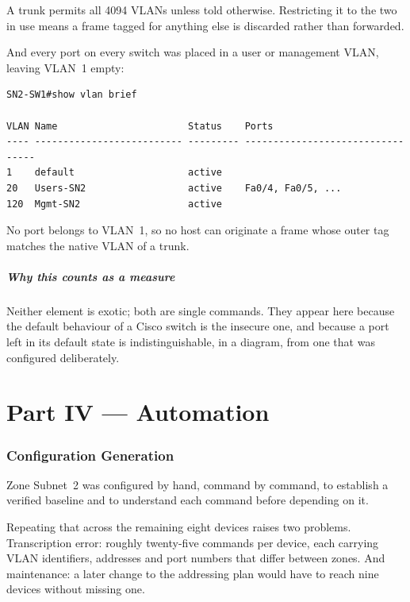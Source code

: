 \documentclass[12pt,a4paper]{article}
\begin{document}
A trunk permits all 4094 VLANs unless told otherwise. Restricting it to the two
in use means a frame tagged for anything else is discarded rather than
forwarded.

And every port on every switch was placed in a user or management VLAN, leaving
VLAN~1 empty:

\begin{lstlisting}
SN2-SW1#show vlan brief

VLAN Name                       Status    Ports
---- -------------------------- --------- ---------------------------------
1    default                    active
20   Users-SN2                  active    Fa0/4, Fa0/5, ...
120  Mgmt-SN2                   active
\end{lstlisting}

No port belongs to VLAN~1, so no host can originate a frame whose outer tag
matches the native VLAN of a trunk.

\subsubsection*{Why this counts as a measure}

Neither element is exotic; both are single commands. They appear here because
the default behaviour of a Cisco switch is the insecure one, and because a port
left in its default state is indistinguishable, in a diagram, from one that was
configured deliberately.

\part*{Part IV --- Automation}

\section{Configuration Generation}

Zone Subnet~2 was configured by hand, command by command, to establish a verified
baseline and to understand each command before depending on it.

Repeating that across the remaining eight devices raises two problems.
Transcription error: roughly twenty-five commands per device, each carrying VLAN
identifiers, addresses and port numbers that differ between zones. And
maintenance: a later change to the addressing plan would have to reach nine
devices without missing one.
\end{document}
